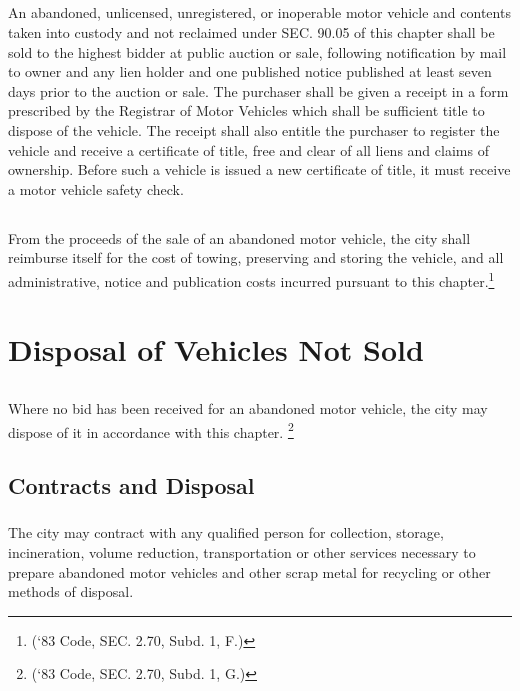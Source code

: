 \subsection{}
An abandoned, unlicensed, unregistered, or inoperable motor vehicle and contents taken into custody and not reclaimed under SEC. 90.05 of this chapter shall be sold to the highest bidder at public auction or sale, following notification by mail to owner and any lien holder and one published notice published at least seven days prior to the auction or sale. The purchaser shall be given a receipt in a form prescribed by the Registrar of Motor Vehicles which shall be sufficient title to dispose of the vehicle. The receipt shall also entitle the purchaser to register the vehicle and receive a certificate of title, free and clear of all liens and claims of ownership.  Before such a vehicle is issued a new certificate of title, it must receive a motor vehicle safety check.
\subsection{}
From the proceeds of the sale of an abandoned motor vehicle, the city shall reimburse itself for the cost of towing, preserving and storing the vehicle, and all administrative, notice and publication costs incurred pursuant to this chapter.\footnote{(‘83 Code, SEC. 2.70, Subd. 1, F.)}

\section{Disposal of Vehicles Not Sold}
\subsection{}
Where no bid has been received for an abandoned motor vehicle, the city may dispose of it in accordance with this chapter. \footnote{(‘83 Code, SEC. 2.70, Subd. 1, G.)}
\subsection{Contracts and Disposal}
\subsubsection{}
The city may contract with any qualified person for collection, storage, incineration, volume reduction, transportation or other services necessary to prepare abandoned motor vehicles and other scrap metal for recycling or other methods of disposal.
